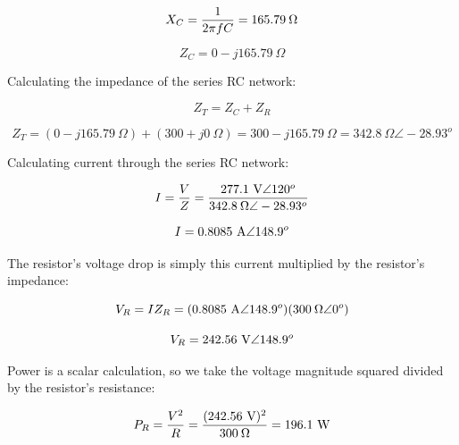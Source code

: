 $$X_C = {1 \over 2 \pi f C} = 165.79 \> \Omega$$

$$Z_C = 0 - j165.79 \> \Omega$$

\vskip 10pt

Calculating the impedance of the series RC network:

$$Z_T = Z_C + Z_R$$

$$Z_T = (0 - j165.79 \> \Omega) + (300 + j0 \> \Omega) = 300 - j165.79 \> \Omega = 342.8 \> \Omega \angle -28.93^o$$

\vskip 10pt

Calculating current through the series RC network:

$$I = {V \over Z} = {277.1 \hbox{ V} \angle 120^o \over 342.8 \> \Omega \angle -28.93^o}$$

$$I = 0.8085 \hbox{ A} \angle 148.9^o$$

\vskip 10pt

The resistor's voltage drop is simply this current multiplied by the resistor's impedance:

$$V_R = IZ_R = (0.8085 \hbox{ A} \angle 148.9^o)(300 \> \Omega \angle 0^o)$$

$$V_R = 242.56 \hbox{ V} \angle 148.9^o$$

\vskip 10pt

Power is a scalar calculation, so we take the voltage magnitude squared divided by the resistor's resistance:

$$P_R = {V^2 \over R} = {(242.56 \hbox{ V})^2 \over 300 \> \Omega} = 196.1 \hbox{ W}$$




